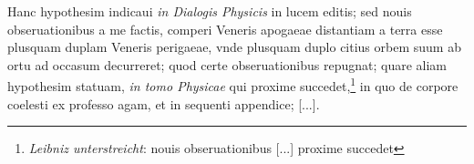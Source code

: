 \pend \pstart [p.~190] Hanc hypothesim indicaui \textit{in Dialogis Physicis} in lucem editis; sed  nouis obseruationibus a me factis, comperi Veneris\protect{} apogaeae distantiam a terra\protect{} esse plusquam duplam Veneris\protect{} perigaeae, vnde plusquam duplo citius orbem suum ab ortu  ad occasum decurreret; quod certe obseruationibus repugnat; quare aliam hypothesim statuam, \textit{in tomo Physicae} qui proxime succedet,\footnote{\textit{Leibniz unterstreicht}: nouis obseruationibus [...] proxime succedet} in quo de corpore coelesti ex  professo agam, et in sequenti appendice; [...].
